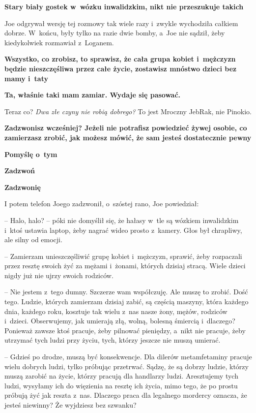 \documentclass[oneside,polish,11pt,sfheadings]{mwbk}
\begin{document}
\textbf{ Stary biały gostek w~wózku inwalidzkim, nikt nie
przeszukuje takich}

Joe odgrywał wersję tej rozmowy tak wiele razy i~zwykle wychodziła
całkiem dobrze. W~końcu, były tylko na razie dwie bomby, a~Joe nie
sądził, żeby kiedykolwiek rozmawiał z~Loganem.

\textbf{ Wszystko, co zrobisz, to sprawisz, że cała grupa
kobiet i~mężczyzn będzie nieszczęśliwa przez całe życie, zostawisz
mnóstwo dzieci bez mamy i~taty}

\textbf{ Ta, właśnie taki mam zamiar. Wydaje się pasować.}

Teraz co? \textit{Dwa złe czyny nie robią dobrego?} To jest Mroczny
JebRak, nie Pinokio.

\textbf{ Zadzwonisz wcześniej? Jeżeli nie potrafisz
powiedzieć żywej osobie, co zamierzasz zrobić, jak możesz mówić, że sam
jesteś dostatecznie pewny }

\textbf{ Pomyślę o~tym}

\textbf{ Zadzwoń}

\textbf{ Zadzwonię}

I potem telefon Joego zadzwonił, o~szóstej rano, Joe powiedział: 

-- Halo, halo? -- póki nie domyślił się, że hałasy w~tle są wózkiem inwalidzkim i~ktoś ustawia laptop, żeby nagrać wideo prosto z~kamery. Głos był
chrapliwy, ale silny od emocji.

-- Zamierzam unieszczęśliwić grupę kobiet i~mężczyzn, sprawić, żeby
rozpaczali przez resztę swoich żyć za mężami i~żonami, których dzisiaj
stracą. Wiele dzieci nigdy już nie ujrzy swoich rodziców.

-- Nie jestem z~tego dumny. Szczerze wam współczuję. Ale muszę to zrobić.
Dość tego. Ludzie, których zamierzam dzisiaj zabić, są częścią maszyny,
która każdego dnia, każdego roku, kosztuje tak wielu z~nas nasze żony,
mężów, rodziców i~dzieci. Obserwujemy, jak umierają złą, wolną, bolesną
śmiercią i~dlaczego? Ponieważ zawsze ktoś pracuje, żeby pilnować
pieniędzy, a~nikt nie pracuje, żeby utrzymać tych ludzi przy życiu,
tych, którzy jeszcze nie muszą umierać.

-- Gdzieś po drodze, muszą być konsekwencje. Dla dilerów metamfetaminy
pracuje wielu dobrych ludzi, tylko próbując przetrwać. Sądzę, że są
dobrzy ludzie, którzy muszą zarobić na życie, którzy pracują dla
handlarzy ludzi. Aresztujemy tych ludzi, wysyłamy ich do więzienia na
resztę ich życia, mimo tego, że po prostu próbują żyć jak reszta z~nas.
Dlaczego praca dla legalnego mordercy oznacza, że jesteś niewinny? Że
wyjdziesz bez szwanku?
\end{document}
